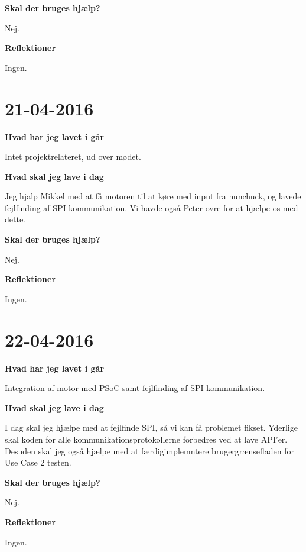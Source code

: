\documentclass{article}
\begin{document}
	\textbf{Skal der bruges hjælp?}
	
	Nej.
	
	\textbf{Reflektioner}
	
	Ingen.
	
	\section{21-04-2016}
	\textbf{Hvad har jeg lavet i går}
	
	Intet projektrelateret, ud over mødet.
	
	\textbf{Hvad skal jeg lave i dag}
	
	Jeg hjalp Mikkel med at få motoren til at køre med input fra nunchuck, og lavede fejlfinding af SPI kommunikation. Vi havde også Peter ovre for at hjælpe os med dette.
	
	\textbf{Skal der bruges hjælp?}
	
	Nej.
	
	\textbf{Reflektioner}
	
	Ingen.
	
	\section{22-04-2016}
	\textbf{Hvad har jeg lavet i går}
	
	Integration af motor med PSoC samt fejlfinding af SPI kommunikation.
	
	\textbf{Hvad skal jeg lave i dag}
	
	I dag skal jeg hjælpe med at fejlfinde SPI, så vi kan få problemet fikset. Yderlige skal koden for alle kommunikationsprotokollerne forbedres ved at lave API'er. Desuden skal jeg også hjælpe med at færdigimplemntere brugergrænsefladen for Use Case 2 testen.
	
	\textbf{Skal der bruges hjælp?}
	
	Nej.
	
	\textbf{Reflektioner}
	
	Ingen.
\end{document}
